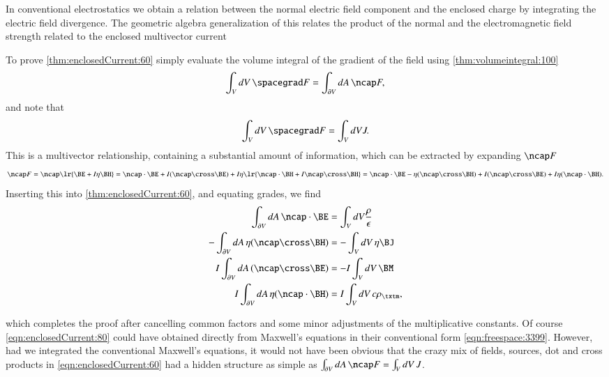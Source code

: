 %
%
In conventional electrostatics we obtain a relation between the normal electric field component and the enclosed charge by integrating the electric field divergence.
The geometric algebra generalization of this relates the product of the normal and the electromagnetic field strength related to the enclosed multivector current

To prove \cref{thm:enclosedCurrent:60}
simply evaluate the volume integral of the gradient of the field using \cref{thm:volumeintegral:100}
\begin{equation}\label{eqn:enclosedCurrent:20}
\int_V dV\, \spacegrad F = \int_{\partial V} dA\, \ncap F,
\end{equation}
and note that
\begin{dmath}\label{eqn:enclosedCurrent:60}
\int_V dV\, \spacegrad F = \int_V dV J.
\end{dmath}
This is a multivector relationship, containing a substantial amount of information, which can be
extracted by
expanding \( \ncap F \)
\begin{dmath}\label{eqn:enclosedCurrent:40}
\ncap F
=
\ncap \lr{ \BE + I \eta \BH }
=
\ncap \cdot \BE + I (\ncap \cross \BE) + I \eta \lr{ \ncap \cdot \BH + I \ncap \cross \BH }
=
\ncap \cdot \BE - \eta ( \ncap \cross \BH ) + I (\ncap \cross \BE) + I \eta (\ncap \cdot \BH).
\end{dmath}
Inserting this into
\cref{thm:enclosedCurrent:60}, and equating grades, we find
\begin{dmath}\label{eqn:enclosedCurrent:80}
\begin{aligned}
\int_{\partial V} dA \,\ncap \cdot \BE &= \int_V dV \frac{\rho}{\epsilon} \\
- \int_{\partial V} dA\, \eta ( \ncap \cross \BH ) &= - \int_V dV\, \eta \BJ \\
 I \int_{\partial V} dA\, (\ncap \cross \BE) &= - I \int_V dV\, \BM \\
 I \int_{\partial V} dA\, \eta (\ncap \cdot \BH) &=  I \int_V dV\, c \rho_\txtm,
\end{aligned}
\end{dmath}

which completes the proof after cancelling common factors and some minor adjustments of the multiplicative constants.
Of course \cref{eqn:enclosedCurrent:80}
could have obtained directly from Maxwell's equations in their conventional form \cref{eqn:freespace:3399}.
However, had we integrated the conventional Maxwell's equations, it would not have been obvious that the crazy mix of
fields, sources, dot and cross products in \cref{eqn:enclosedCurrent:60} had a hidden structure as simple as
\( \int_{\partial V} dA\, \ncap F = \int_V dV\, J \).
